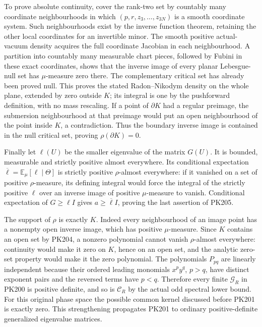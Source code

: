 \documentclass[11pt]{article}
\begin{document}
To prove absolute continuity, cover the rank-two set by
countably many coordinate neighbourhoods in which
\((p,r,z_3,\ldots,z_{3N})\) is a smooth coordinate system.
Such neighbourhoods exist by the inverse function theorem,
retaining the other local coordinates for an invertible
minor. The smooth positive actual-vacuum density acquires
the full coordinate Jacobian in each neighbourhood.
A partition into countably many measurable chart pieces,
followed by Fubini in these exact coordinates, shows that
the inverse image of every planar Lebesgue-null set has
\(\mu\)-measure zero there. The complementary critical
set has already been proved null. This proves the stated
Radon–Nikodym density on the whole plane, extended by zero
outside \(K\); its integral is one by the pushforward
definition, with no mass rescaling.
If a point of \(\partial K\) had a regular preimage, the
submersion neighbourhood at that preimage would put an open
neighbourhood of the point inside \(K\), a contradiction.
Thus the boundary inverse image is contained in the null
critical set, proving \(\rho(\partial K)=0\).

Finally let \(\ell(U)\) be the smaller eigenvalue of the
matrix \(G(U)\). It is bounded, measurable and strictly
positive almost everywhere. Its conditional expectation
\(\overline\ell=\mathbb E_\mu[\ell\mid\Theta]\) is strictly
positive \(\rho\)-almost everywhere: if it vanished on a
set of positive \(\rho\)-measure, its defining integral
would force the integral of the strictly positive \(\ell\)
over an inverse image of positive \(\mu\)-measure to vanish.
Conditional expectation of \(G\ge\ell I\) gives
\(a\ge\overline\ell I\), proving the last assertion of PK205.

The support of \(\rho\) is exactly \(K\). Indeed every
neighbourhood of an image point has a nonempty open inverse
image, which has positive \(\mu\)-measure. Since \(K\)
contains an open set by PK204, a nonzero polynomial cannot
vanish \(\rho\)-almost everywhere: continuity would make it
zero on \(K\), hence on an open set, and the analytic
zero-set property would make it the zero polynomial.
The polynomials \(P_{pq}\) are linearly independent because
their ordered leading monomials \(x^py^q\), \(p>q\), have
distinct exponent pairs and the reversed terms have \(p<q\).
Therefore every finite \(\mathcal G_R\) in PK200 is positive
definite, and so is \(\mathcal C_R\) by the actual odd
spectral lower bound. For this original phase space the
possible common kernel discussed before PK201 is exactly
zero. This strengthening propagates PK201 to ordinary
positive-definite generalized eigenvalue matrices.
\end{document}
